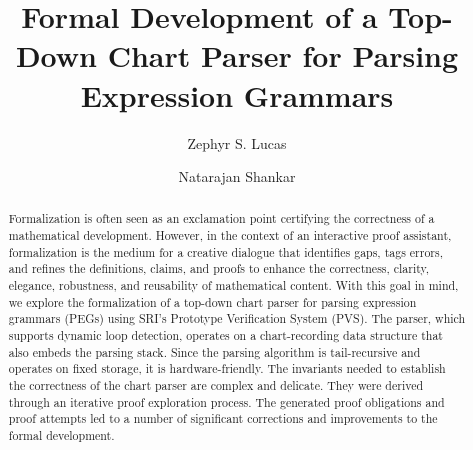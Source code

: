 \documentclass[sigplan,10pt,anonymous,review]{acmart}\settopmatter{printfolios=true,printccs=false,printacmref=false}
\begin{document}
\title{Formal Development of a Top-Down Chart Parser for Parsing Expression Grammars}


\author{Zephyr S. Lucas}


\author{Natarajan Shankar}



\begin{abstract}
  Formalization is often seen as an exclamation point 
   certifying the correctness of a mathematical development.  However, in
  the context of an interactive proof assistant, formalization is the medium for a
  creative dialogue that identifies gaps, tags errors, and refines the
  definitions, claims, and proofs to enhance the correctness, clarity,
  elegance, robustness,
  and reusability of mathematical content.  With this goal in
  mind, we explore the formalization of a top-down chart parser for
  parsing expression grammars (PEGs) using SRI's Prototype
  Verification System (PVS).  The parser, which supports dynamic loop
  detection, operates on a chart-recording data structure that also embeds the
  parsing stack.  Since the parsing algorithm is tail-recursive and
  operates on fixed storage, it is hardware-friendly.  The invariants
  needed to establish the correctness of the chart parser are complex
  and delicate.  They were derived through an iterative proof
  exploration process.  The generated proof obligations and proof
  attempts led to a number of significant corrections and improvements
  to the formal development.
\end{abstract}
\end{document}

